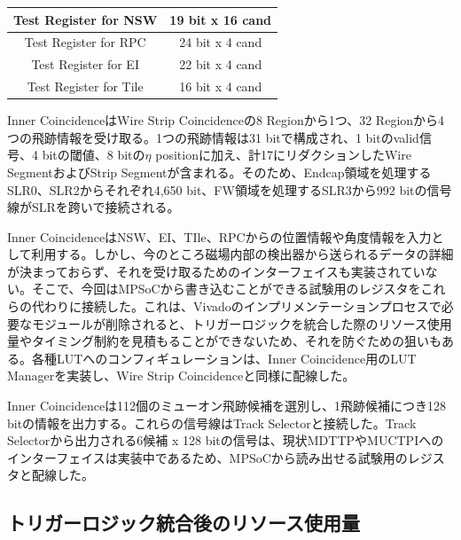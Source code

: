 \begin{table}[]
\begin{tabular}{|c|c|}
    Test Register for NSW                    & 19 bit x 16 cand                                                                                                               \\ \hline
    Test Register for RPC                    & 24 bit x 4 cand                                                                                                                \\ \hline
    Test Register for EI                     & 22 bit x 4 cand                                                                                                                \\ \hline
    Test Register for Tile                   & 16 bit x 4 cand                                                                                                                \\ \hline
    \end{tabular}
\end{table}

Inner CoincidenceはWire Strip Coincidenceの8 Regionから1つ、32 Regionから4つの飛跡情報を受け取る。1つの飛跡情報は31 bitで構成され、1 bitのvalid信号、4 bitの\pt 閾値、8 bitの$\eta$ positionに加え、計17にリダクションしたWire SegmentおよびStrip Segmentが含まれる。そのため、Endcap領域を処理するSLR0、SLR2からそれぞれ4,650 bit、FW領域を処理するSLR3から992 bitの信号線がSLRを跨いで接続される。

Inner CoincidenceはNSW、EI、TIle、RPCからの位置情報や角度情報を入力として利用する。しかし、今のところ磁場内部の検出器から送られるデータの詳細が決まっておらず、それを受け取るためのインターフェイスも実装されていない。そこで、今回はMPSoCから書き込むことができる試験用のレジスタをこれらの代わりに接続した。これは、Vivadoのインプリメンテーションプロセスで必要なモジュールが削除されると、トリガーロジックを統合した際のリソース使用量やタイミング制約を見積もることができないため、それを防ぐための狙いもある。各種LUTへのコンフィギュレーションは、Inner Coincidence用のLUT Managerを実装し、Wire Strip Coincidenceと同様に配線した。

Inner Coincidenceは112個のミューオン飛跡候補を選別し、1飛跡候補につき128 bitの情報を出力する。これらの信号線はTrack Selectorと接続した。Track Selectorから出力される6候補 x 128 bitの信号は、現状MDTTPやMUCTPIへのインターフェイスは実装中であるため、MPSoCから読み出せる試験用のレジスタと配線した。

\subsection{トリガーロジック統合後のリソース使用量}

